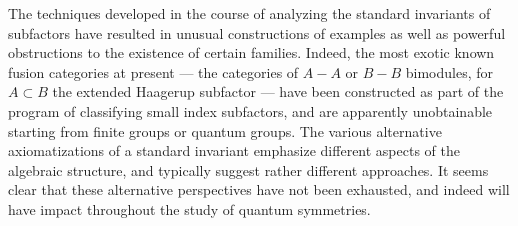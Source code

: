 \documentclass[12pt]{article}
\begin{document}
The techniques developed in the course of analyzing the standard invariants of
subfactors have resulted in unusual constructions of examples as well as
powerful obstructions to the existence of certain families. Indeed, the most
exotic known fusion categories at present --- the categories of $A-A$ or $B-B$
bimodules, for $A \subset B$ the extended Haagerup subfactor ---  have been
constructed as part of the program of classifying small index subfactors, and are apparently
unobtainable starting from finite groups or quantum groups.
The various alternative axiomatizations of a standard invariant emphasize
different aspects of the algebraic structure, and typically suggest rather
different approaches. It seems clear that
these alternative perspectives have not been exhausted, and indeed will have
impact throughout the study of quantum symmetries. 
\end{document}
